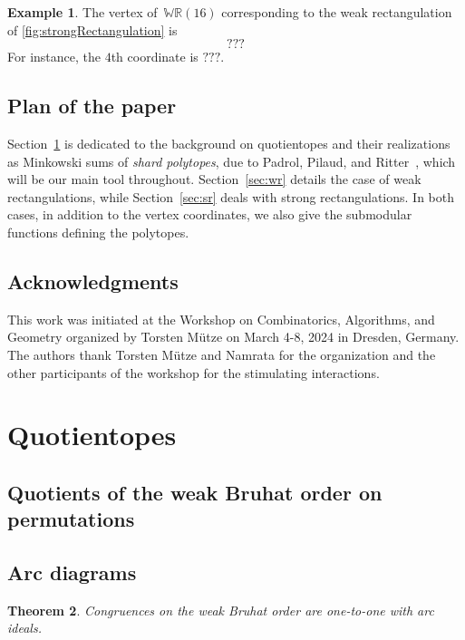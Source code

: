 \documentclass{amsart}
\newtheorem{theorem}{Theorem}%
\theoremstyle{definition}
\newtheorem{example}[theorem]{Example}
\newcommand{\darkblue}{\color{darkblue}} %
\newcommand{\defn}[1]{\textsl{\darkblue #1}} %
\newcommand{\polytope}[1]{\mathds{#1}} %
\newcommand{\WRP}{\polytope{WR}} %
\begin{document}
\begin{example}
The vertex of~$\WRP (16)$ corresponding to the weak rectangulation of \cref{fig:strongRectangulation} is
\[
???
\]
For instance, the $4$th coordinate is $???$.

\end{example}

\subsection{Plan of the paper}

Section~\ref{sec:quotientopes} is dedicated to the background on quotientopes and their realizations as Minkowski sums of \defn{shard polytopes}, due to Padrol, Pilaud, and Ritter~\cite{MR4584712}, which will be our main tool throughout. Section~\ref{sec:wr} details the case of weak rectangulations, while Section~\ref{sec:sr} deals with strong rectangulations. In both cases, in addition to the vertex coordinates, we also give the submodular functions defining the polytopes.

\subsection*{Acknowledgments}

This work was initiated at the Workshop on Combinatorics, Algorithms, and Geometry organized by Torsten M\"utze on March 4-8, 2024 in Dresden, Germany. The authors thank Torsten M\"utze and Namrata for the organization and the other participants of the workshop for the stimulating interactions.


\section{Quotientopes}
\label{sec:quotientopes}

\subsection{Quotients of the weak Bruhat order on permutations}

\subsection{Arc diagrams}

\begin{theorem}
  Congruences on the weak Bruhat order are one-to-one with arc ideals.
\end{theorem}
\end{document}
